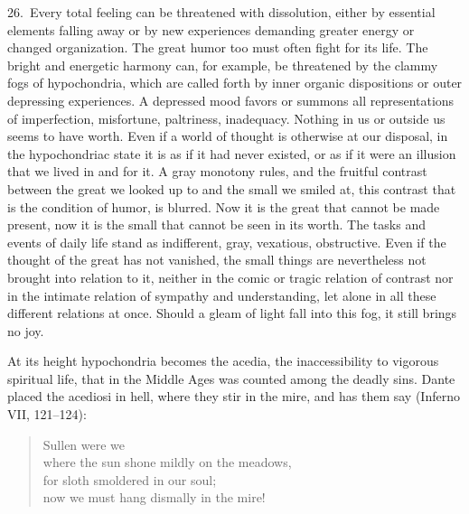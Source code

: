 \documentclass[12pt]{book}
\newcommand{\opage}[1]{\marginnote{\footnotesize\textit{[#1]}}}
\begin{document}
26.~Every total feeling can be threatened with dissolution, either by essential
elements falling away or by new experiences demanding greater energy or changed
organization. The great humor too must often fight for its life. The bright and
energetic harmony can, for example, be threatened by the clammy fogs of hypochondria,
which are called forth by inner organic dispositions or outer depressing experiences. A
depressed mood favors or summons all \opage{96}representations of imperfection,
misfortune, paltriness, inadequacy. Nothing in us or outside us seems to have worth.
Even if a world of thought is otherwise at our disposal, in the hypochondriac state it
is as if it had never existed, or as if it were an illusion that we lived in and for
it. A gray monotony rules, and the fruitful contrast between the great we looked up to
and the small we smiled at, this contrast that is the condition of humor, is blurred.
Now it is the great that cannot be made present, now it is the small that cannot be
seen in its worth. The tasks and events of daily life stand as indifferent, gray,
vexatious, obstructive. Even if the thought of the great has not vanished, the small
things are nevertheless not brought into relation to it, neither in the comic or tragic
relation of contrast nor in the intimate relation of sympathy and understanding, let
alone in all these different relations at once. Should a gleam of light fall into this
fog, it still brings no joy.

At its height hypochondria becomes the acedia, the inaccessibility to vigorous spiritual
life, that in the Middle Ages was counted among the deadly sins. Dante placed the
acediosi in hell, where they stir in the mire, and has them say (Inferno VII,
121--124):

\begin{quote}
Sullen were we\\
where the sun shone mildly on the meadows,\\
for sloth smoldered in our soul;\\
now we must hang dismally in the mire!
\end{quote}
\end{document}
